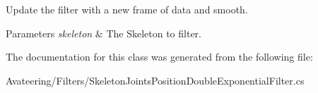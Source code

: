 Update the filter with a new frame of data and smooth. 


\begin{DoxyParams}{Parameters}
{\em skeleton} & The Skeleton to filter.\\
\hline
\end{DoxyParams}


The documentation for this class was generated from the following file\+:\begin{DoxyCompactItemize}
\item 
Avateering/\+Filters/Skeleton\+Joints\+Position\+Double\+Exponential\+Filter.\+cs\end{DoxyCompactItemize}
